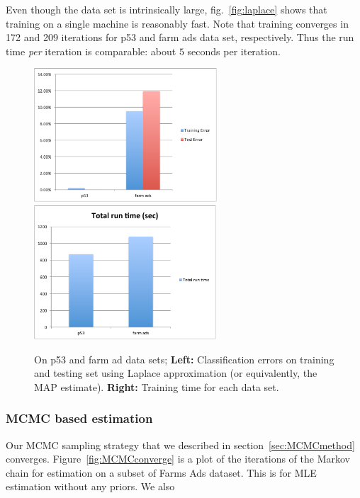 Even though the data set is intrinsically large, fig.~\ref{fig:laplace} shows
that training on a single machine is reasonably fast. Note that training
converges in 172 and 209 iterations for p53 and farm ads data set,
respectively. Thus the run time {\em per} iteration is comparable: about $5$
seconds per iteration.


\begin{figure}[t]
\label{fig:laplace}
\centering
\includegraphics[height=5.0cm]{../../results/classificaiton_errors.pdf}
\includegraphics[height=5.0cm]{../../results/runtime.pdf}

\caption{\small On p53 and farm ad data sets; {\bf Left:} Classification errors on
training and testing set using Laplace approximation (or equivalently, the
MAP estimate). {\bf Right:} Training time for each data set. }

\label{graphlab}
\end{figure}

\subsubsection{MCMC based estimation}
Our MCMC sampling strategy that we described in section~\ref{sec:MCMCmethod}
converges. Figure~\ref{fig:MCMCconverge} is a plot of the iterations of the Markov 
chain for estimation on a subset of Farms Ads dataset. This is for MLE
estimation without any priors. We also 

